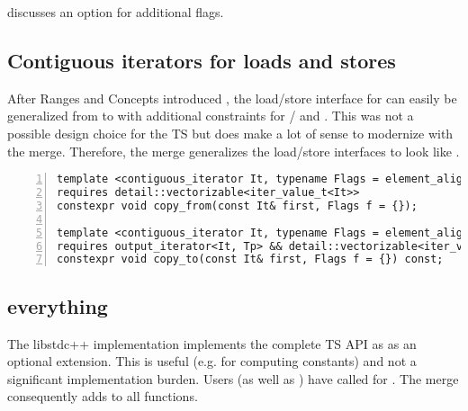  discusses an option for additional flags.

\subsection{Contiguous iterators for loads and stores}\label{sec:contiguousItLoadStore}

After Ranges and Concepts introduced , the
load/store interface for  can easily be generalized from 
to  with additional constraints for
/ and .
This was not a possible design choice for the TS but does make a lot of sense
to modernize with the merge.
Therefore, the merge generalizes the load/store interfaces to look like
.
\begin{lstlisting}[numbers=left,float={hbtp},label=lst:copyImpl,caption={
    \code{copy_from} and \code{copy_to} declarations using \code{contiguous_iterator}
}]
template <contiguous_iterator It, typename Flags = element_aligned_tag>
requires detail::vectorizable<iter_value_t<It>>
constexpr void copy_from(const It& first, Flags f = {});

template <contiguous_iterator It, typename Flags = element_aligned_tag>
requires output_iterator<It, Tp> && detail::vectorizable<iter_value_t<It>>
constexpr void copy_to(const It& first, Flags f = {}) const;
\end{lstlisting}

\subsection{ everything}
The libstdc++ implementation implements the complete TS API as  as an optional extension.
This is useful (e.g. for computing constants) and not a significant implementation burden.
Users (as well as \textcite{P2638R0}) have called for .
The merge consequently adds  to all functions.

